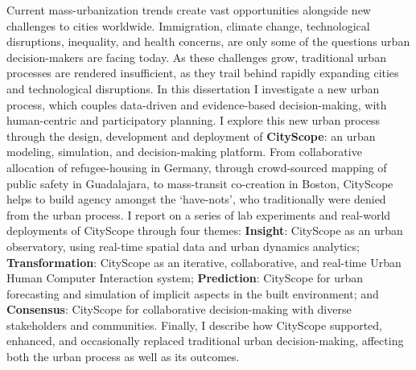 {
Current mass-urbanization trends create vast opportunities alongside new challenges to cities worldwide. Immigration, climate change, technological disruptions, inequality, and health concerns, are only some of the questions urban decision-makers are facing today. As these challenges grow, traditional urban processes are rendered insufficient, as they trail behind rapidly expanding cities and technological disruptions.
\newline
In this dissertation I investigate a new urban process, which couples data-driven and evidence-based decision-making, with human-centric and participatory planning. I explore this new urban process through the design, development and deployment of \textbf{CityScope}: an urban modeling, simulation, and decision-making platform. From collaborative allocation of refugee-housing in Germany, through crowd-sourced mapping of public safety in Guadalajara, to mass-transit co-creation in Boston, CityScope helps to build agency amongst the `have-nots', who traditionally were denied from the urban process.
\newline
I report on a series of lab experiments and real-world deployments of CityScope through four themes: \textbf{Insight}: CityScope as an urban observatory, using real-time spatial data and urban dynamics analytics; \textbf{Transformation}: CityScope as an iterative, collaborative, and real-time Urban Human Computer Interaction system; \textbf{Prediction}: CityScope for urban forecasting and simulation of implicit aspects in the built environment; and \textbf{Consensus}: CityScope for collaborative decision-making with diverse stakeholders and communities.
\newline
Finally, I describe how CityScope supported, enhanced, and occasionally replaced traditional urban decision-making, affecting both the urban process as well as its outcomes.
}

